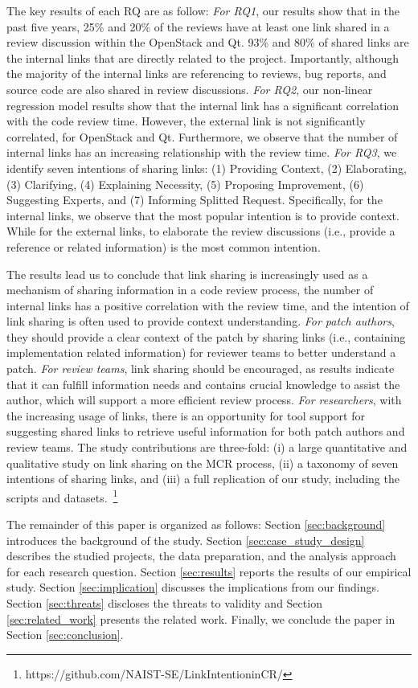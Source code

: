 The key results of each RQ are as follow:
\textit{For RQ1}, our results show that in the past five years, 25\% and 20\% of the reviews have at least one link shared in a review discussion within the OpenStack and Qt.
93\% and 80\% of shared links are the internal links that are directly related to the project.
Importantly, although the majority of the internal links are referencing to reviews, bug reports, and source code are also shared in review discussions.
\textit{For RQ2}, our non-linear regression model results show that the internal link has a significant correlation with the code review time.  
However, the  external  link  is  not  significantly  correlated,  for OpenStack and Qt.
Furthermore, we observe that the number of internal links has an increasing relationship with the review time.
\textit{For RQ3}, we identify seven intentions of sharing links: (1) Providing Context, (2) Elaborating, (3) Clarifying, (4) Explaining Necessity, (5) Proposing Improvement, (6) Suggesting Experts, and (7) Informing Splitted Request.
Specifically, for the internal links, we observe that the most popular intention is to provide context.
While for the external links, to elaborate the review discussions (i.e., provide a reference or related information) is the most common intention.

The results lead us to conclude that link sharing is increasingly used as a mechanism of sharing information in a code review process, the number of internal links has a positive correlation with the review time, and the intention of link sharing is often used to provide context understanding.
\textit{For patch authors}, they should provide a clear context of the patch by sharing links (i.e., containing implementation related information) for reviewer teams to better understand a patch.
\textit{For review teams}, link sharing should be encouraged, as results indicate that it can fulfill information needs and contains crucial knowledge to assist the author, which will support a more efficient review process.
\textit{For researchers}, with the increasing usage of links, there is an opportunity for tool support for suggesting shared links to retrieve useful information for both patch authors and review teams.
The study contributions are three-fold: (i) a large quantitative and qualitative study on link sharing on the MCR process, (ii) a taxonomy of seven intentions of sharing links, and (iii) a full replication of our study, including the scripts and datasets.~\footnote{https://github.com/NAIST-SE/LinkIntentioninCR/}

The remainder of this paper is organized as follows: Section \ref{sec:background} introduces the background of the study. 
Section \ref{sec:case_study_design} describes the studied projects, the data preparation, and the analysis approach for each research question.
Section \ref{sec:results} reports the results of our empirical study. 
Section \ref{sec:implication} discusses the implications from our findings. 
Section \ref{sec:threats} discloses the threats to validity and Section \ref{sec:related_work} presents the related work. 
Finally, we conclude the paper in Section \ref{sec:conclusion}.
